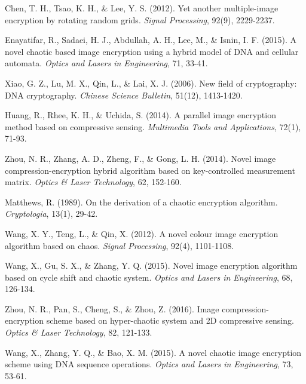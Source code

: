  Chen, T. H., Tsao, K. H., \& Lee, Y. S. (2012). Yet another multiple-image encryption by rotating random grids. \textit{Signal Processing}, 92(9), 2229-2237.



 Enayatifar, R., Sadaei, H. J., Abdullah, A. H., Lee, M., \& Isnin, I. F. (2015). A novel chaotic based image encryption using a hybrid model of DNA and cellular automata. \textit{Optics and Lasers in Engineering}, 71, 33-41.



 Xiao, G. Z., Lu, M. X., Qin, L., \& Lai, X. J. (2006). New field of cryptography: DNA cryptography. \textit{Chinese Science Bulletin}, 51(12), 1413-1420.



 Huang, R., Rhee, K. H., \& Uchida, S. (2014). A parallel image encryption method based on compressive sensing. \textit{Multimedia Tools and Applications}, 72(1), 71-93.



 Zhou, N. R., Zhang, A. D., Zheng, F., \& Gong, L. H. (2014). Novel image compression-encryption hybrid algorithm based on key-controlled measurement matrix. \textit{Optics \& Laser Technology}, 62, 152-160.



 Matthews, R. (1989). On the derivation of a chaotic encryption algorithm. \textit{Cryptologia}, 13(1), 29-42.



 Wang, X. Y., Teng, L., \& Qin, X. (2012). A novel colour image encryption algorithm based on chaos. \textit{Signal Processing}, 92(4), 1101-1108.



 Wang, X., Gu, S. X., \& Zhang, Y. Q. (2015). Novel image encryption algorithm based on cycle shift and chaotic system. \textit{Optics and Lasers in Engineering}, 68, 126-134.



 Zhou, N. R., Pan, S., Cheng, S., \& Zhou, Z. (2016). Image compression-encryption scheme based on hyper-chaotic system and 2D compressive sensing. \textit{Optics \& Laser Technology}, 82, 121-133.



 Wang, X., Zhang, Y. Q., \& Bao, X. M. (2015). A novel chaotic image encryption scheme using DNA sequence operations. \textit{Optics and Lasers in Engineering}, 73, 53-61.



